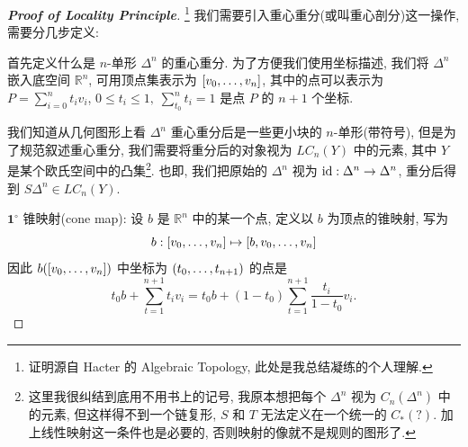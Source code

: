        \begin{proof}[{\bf Proof of Locality Principle}]\footnote{证明源自 Hacter 的 Algebraic Topology, 此处是我总结凝练的个人理解.}
            我们需要引入重心重分(或叫重心剖分)这一操作, 需要分几步定义:

             首先定义什么是 $n$-单形 $\Delta^n$ 的重心重分. 为了方便我们使用坐标描述, 
            我们将 $\Delta^n$ 嵌入底空间 $\mathbb{R}^n$, 可用顶点集表示为 $[{v}_{0},\dots,{v}_{n}]$, 
            其中的点可以表示为 $P = \sum_{i=0}^{n}t_iv_i$, $0\leq t_i\leq 1,\;\sum_{t_0}^{n}t_i=1$ 是点 $P$ 的 $n+1$ 个坐标.
            
            我们知道从几何图形上看 $\Delta^n$ 重心重分后是一些更小块的 $n$-单形(带符号),
            但是为了规范叙述重心重分, 我们需要将重分后的对象视为 $LC_n(Y)$ 中的元素, 其中 $Y$ 是某个欧氏空间中的凸集\footnote{这里我很纠结到底用不用书上的记号, 我原本想把每个 $\Delta^n$ 视为 $C_n(\Delta^n)$ 中的元素, 但这样得不到一个链复形, $S$ 和 $T$ 无法定义在一个统一的 $C_*(?)$. 加上线性映射这一条件也是必要的, 否则映射的像就不是规则的图形了.}. 
            也即, 我们把原始的 $\Delta^n$ 视为 ${\rm id}:\Delta^n\rightarrow\Delta^n$, 重分后得到 $S\Delta^n\in LC_n(Y)$.

            \noindent$\mathbf{1}^{\circ}$ 锥映射(cone map): 设 $b$ 是 $\mathbb{R}^{n}$ 中的某一个点, 定义以 $b$ 为顶点的锥映射, 写为
            \begin{equation*}
                b:[{v}_{0},\dots,{v}_{n}]\mapsto[b,{v}_{0},\dots,{v}_{n}]
            \end{equation*}
            因此 $b([{v}_{0},\dots,{v}_{n}])$ 中坐标为 $({t}_{0},\dots,{t}_{n+1})$ 的点是 
            \begin{equation*}
                t_0b+\sum_{t=1}^{n+1}t_iv_i=t_0b+\left(1-t_0\right)\sum_{t=1}^{n+1}\dfrac{t_i}{1-t_0}v_i. 
            \end{equation*}


\end{proof}
